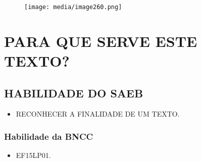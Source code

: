 \begin{figure}[H]
\centering
\texttt{[image: media/image260.png]}
\end{figure}

\chapter{PARA QUE SERVE ESTE TEXTO?}

\section*{HABILIDADE DO SAEB}

\begin{itemize}
\item \uppercase{Reconhecer a finalidade de um texto.}
\end{itemize}

\subsection{Habilidade da BNCC}

\begin{itemize}
\item EF15LP01.
\end{itemize}

